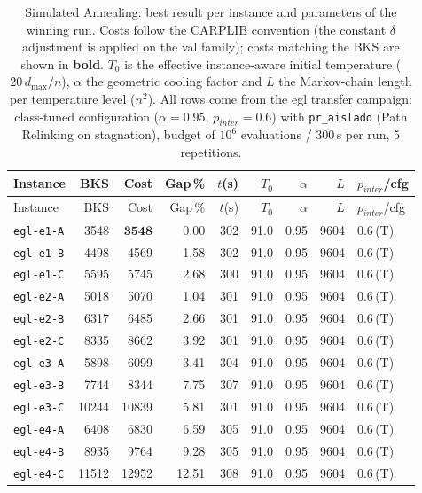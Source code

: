 \begingroup\scriptsize
\begin{longtable}{lrrrrrrrl}
\caption{Simulated Annealing: best result per instance and parameters of the winning run. Costs follow the CARPLIB convention (the constant $\delta$ adjustment is applied on the val family); costs matching the BKS are shown in \textbf{bold}. $T_0$ is the effective instance-aware initial temperature ($20\,d_{\max}/n$), $\alpha$ the geometric cooling factor and $L$ the Markov-chain length per temperature level ($n^2$). All rows come from the egl transfer campaign: class-tuned configuration ($\alpha = 0.95$, $p_{inter} = 0.6$) with \texttt{pr\_aislado} (Path Relinking on stagnation), budget of $10^6$ evaluations / 300\,s per run, 5 repetitions.}\label{tab:sa-egl-per-instance}\\
\toprule
Instance & BKS & Cost & Gap\,\% & $t$(s) & $T_0$ & $\alpha$ & $L$ & $p_{inter}$/cfg \\
\midrule
\endfirsthead
\toprule
Instance & BKS & Cost & Gap\,\% & $t$(s) & $T_0$ & $\alpha$ & $L$ & $p_{inter}$/cfg \\
\midrule
\endhead
\bottomrule
\endfoot
\texttt{egl-e1-A} & 3548 & $\mathbf{3548}$ & 0.00 & 302 & 91.0 & 0.95 & 9604 & 0.6\,(T) \\
\texttt{egl-e1-B} & 4498 & 4569 & 1.58 & 302 & 91.0 & 0.95 & 9604 & 0.6\,(T) \\
\texttt{egl-e1-C} & 5595 & 5745 & 2.68 & 300 & 91.0 & 0.95 & 9604 & 0.6\,(T) \\
\texttt{egl-e2-A} & 5018 & 5070 & 1.04 & 301 & 91.0 & 0.95 & 9604 & 0.6\,(T) \\
\texttt{egl-e2-B} & 6317 & 6485 & 2.66 & 301 & 91.0 & 0.95 & 9604 & 0.6\,(T) \\
\texttt{egl-e2-C} & 8335 & 8662 & 3.92 & 301 & 91.0 & 0.95 & 9604 & 0.6\,(T) \\
\texttt{egl-e3-A} & 5898 & 6099 & 3.41 & 304 & 91.0 & 0.95 & 9604 & 0.6\,(T) \\
\texttt{egl-e3-B} & 7744 & 8344 & 7.75 & 307 & 91.0 & 0.95 & 9604 & 0.6\,(T) \\
\texttt{egl-e3-C} & 10244 & 10839 & 5.81 & 301 & 91.0 & 0.95 & 9604 & 0.6\,(T) \\
\texttt{egl-e4-A} & 6408 & 6830 & 6.59 & 305 & 91.0 & 0.95 & 9604 & 0.6\,(T) \\
\texttt{egl-e4-B} & 8935 & 9764 & 9.28 & 305 & 91.0 & 0.95 & 9604 & 0.6\,(T) \\
\texttt{egl-e4-C} & 11512 & 12952 & 12.51 & 308 & 91.0 & 0.95 & 9604 & 0.6\,(T) \\

\end{longtable}

